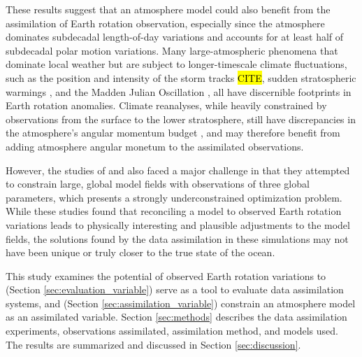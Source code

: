 These results suggest that an atmosphere model could also benefit from the assimilation of Earth rotation observation, especially since the atmosphere dominates subdecadal length-of-day variations and accounts for at least half of subdecadal polar motion variations. 
Many large-atmospheric phenomena that dominate local weather but are subject to longer-timescale climate fluctuations, such as the position and intensity of the storm tracks \hl{CITE}, sudden stratospheric warmings \citep{Neef2014}, and the Madden Julian Oscillation \citep{Weickmann1992}, all have discernible footprints in Earth rotation anomalies. 
Climate reanalyses, while heavily constrained by observations from the surface to the lower stratosphere, still have discrepancies in the atmosphere's angular momentum budget \citep{Berrisford2011,Lehmann2012}, and  may therefore benefit from adding atmosphere angular monetum to the assimilated observations. 

However, the studies of \citet{Saynisch2010,Saynisch2011} and \citet{Saynisch2012} also faced a major challenge in that they attempted to constrain large, global model fields with observations of three global parameters, which presents a strongly underconstrained optimization problem. 
While these studies found that reconciling a model to observed Earth rotation variations leads to physically interesting and plausible adjustments to the model fields, the solutions found by the data assimilation in these simulations may not have been unique or truly closer to the true state of the ocean.  

This study examines the potential of observed Earth rotation variations to (Section \ref{sec:evaluation_variable}) serve as a tool to evaluate data assimilation systems, and (Section \ref{sec:assimilation_variable}) constrain an atmosphere model as an assimilated variable.
Section \ref{sec:methods} describes the data assimilation experiments, observations assimilated, assimilation method, and models used.
The results are summarized and discussed in Section \ref{sec:discussion}.
